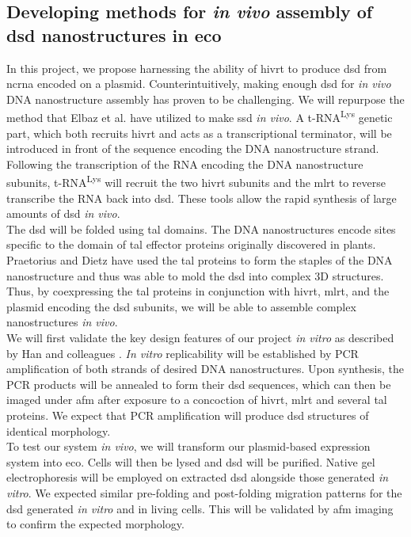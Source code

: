 \documentclass[a4paper]{article}
\begin{document}
\subsection*{Developing methods for \textit{in vivo} assembly of \ac{dsd} nanostructures in \ac{eco}}
In this project, we propose harnessing the ability of \ac{hivrt} to produce \ac{dsd} from \ac{ncrna} encoded on a plasmid.
Counterintuitively, making enough \ac{dsd} for \textit{in vivo} DNA nanostructure assembly has proven to be challenging.
We will repurpose the method that Elbaz et al. have utilized to make \ac{ssd} \textit{in vivo}\cite{meth1}.
A t-RNA\textsuperscript{Lys} genetic part, which both recruits \ac{hivrt} and acts as a transcriptional terminator, will be introduced in front of the sequence encoding the DNA nanostructure strand.
Following the transcription of the RNA encoding the DNA nanostructure subunits, t-RNA\textsuperscript{Lys} will recruit the two \ac{hivrt} subunits and the \ac{mlrt} to reverse transcribe the RNA back into \ac{dsd}.
These tools allow the rapid synthesis of large amounts of \ac{dsd} \textit{in vivo}.
\vspace{2 mm}
\\
The \ac{dsd} will be folded using \ac{tal} domains.
The DNA nanostructures encode sites specific to the domain of \ac{tal} effector proteins originally discovered in plants.
Praetorius and Dietz have used the \ac{tal} proteins to form the staples of the DNA nanostructure and thus was able to mold the \ac{dsd} into complex 3D structures\cite{meth2}.
Thus, by coexpressing the \ac{tal} proteins in conjunction with \ac{hivrt}, \ac{mlrt}, and the plasmid encoding the \ac{dsd} subunits, we will be able to assemble complex nanostructures \textit{in vivo}.
\vspace{2 mm}
\\
We will first validate the key design features of our project \textit{in vitro} as described by Han and colleagues \cite{meth3}.
\textit{In vitro} replicability will be established by PCR amplification of both strands of desired DNA nanostructures.
Upon synthesis, the PCR products will be annealed to form their \ac{dsd} sequences, which can then be imaged under \ac{afm} after exposure to a concoction of \ac{hivrt}, \ac{mlrt} and several \ac{tal} proteins.
We expect that PCR amplification will produce \ac{dsd} structures of identical morphology.
\vspace{2 mm}
\\
To test our system \textit{in vivo}, we will transform our plasmid-based expression system into \ac{eco}.
Cells will then be lysed and \ac{dsd} will be purified.
Native gel electrophoresis will be employed on extracted \ac{dsd} alongside those generated \textit{in vitro}.
We expected similar pre-folding and post-folding migration patterns for the \ac{dsd} generated \textit{in vitro} and in living cells.
This will be validated by \ac{afm} imaging to confirm the expected morphology.
\end{document}
